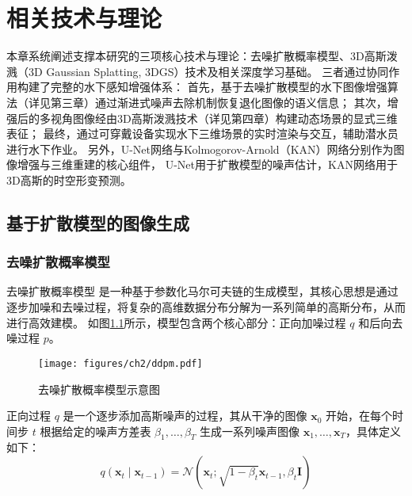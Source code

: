 
\chapter{相关技术与理论}
本章系统阐述支撑本研究的三项核心技术与理论：去噪扩散概率模型、3D高斯泼溅（3D Gaussian Splatting, 3DGS）技术及相关深度学习基础。
三者通过协同作用构建了完整的水下感知增强体系：
首先，基于去噪扩散模型的水下图像增强算法（详见第三章）通过渐进式噪声去除机制恢复退化图像的语义信息；
其次，增强后的多视角图像经由3D高斯泼溅技术（详见第四章）构建动态场景的显式三维表征；
最终，通过可穿戴设备实现水下三维场景的实时渲染与交互，辅助潜水员进行水下作业。
另外，U-Net网络与Kolmogorov-Arnold（KAN）网络分别作为图像增强与三维重建的核心组件，
U-Net用于扩散模型的噪声估计，KAN网络用于3D高斯的时空形变预测。


\section{基于扩散模型的图像生成}

\subsection{去噪扩散概率模型}
去噪扩散概率模型\cite{pre_ddpm}\cite{ddpm} 是一种基于参数化马尔可夫链的生成模型，其核心思想是通过逐步加噪和去噪过程，将复杂的高维数据分布分解为一系列简单的高斯分布，从而进行高效建模。
如图\ref{img:ddpm}所示，模型包含两个核心部分：正向加噪过程 $q$ 和后向去噪过程 $p$。
\begin{figure}
    \centering
    \texttt{[image: figures/ch2/ddpm.pdf]}
    \caption{去噪扩散概率模型示意图}
    \label{img:ddpm}
\end{figure}

正向过程 $q$ 是一个逐步添加高斯噪声的过程，其从干净的图像 $\mathbf{x}_0$ 开始，在每个时间步 $t$ 根据给定的噪声方差表 $\beta_1, \dots, \beta_T$ 生成一系列噪声图像 $\mathbf{x}_1, \dots, \mathbf{x}_T$，具体定义如下：
\begin{equation}
    \label{eq:q_1step}
    q\left(\mathbf{x}_t \mid \mathbf{x}_{t-1}\right)=\mathcal{N}\left(\mathbf{x}_t ; \sqrt{1-\beta_t} \mathbf{x}_{t-1}, \beta_t \mathbf{I}\right)
\end{equation}


